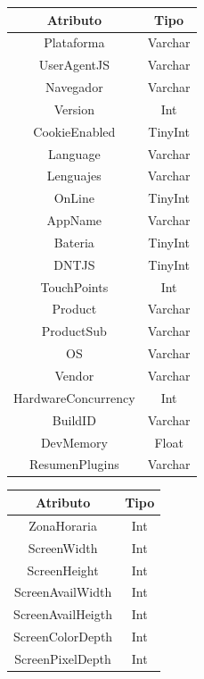 \begin{itemize}
\begin{table}[tbp]
\begin{minipage}[c]{85mm}
            \begin{tabular}{c|c}
                \textbf{Atributo} & \textbf{Tipo} \\ \hline
                Plataforma & Varchar\\
                UserAgentJS & Varchar\\
                Navegador & Varchar\\
                Version & Int\\
                CookieEnabled & TinyInt\\
                Language & Varchar\\
                Lenguajes & Varchar\\
                OnLine & TinyInt\\
                AppName & Varchar\\
                Bateria & TinyInt\\
                DNTJS & TinyInt\\
                TouchPoints & Int\\
                Product & Varchar\\
                ProductSub & Varchar\\
                OS & Varchar\\
                Vendor & Varchar\\
                HardwareConcurrency & Int\\
                BuildID & Varchar\\
                DevMemory & Float\\
                ResumenPlugins & Varchar\\
            \end{tabular}
        \end{minipage}
        \begin{minipage}[c]{45mm}
        \centering
            \begin{tabular}{c|c}
                \textbf{Atributo} & \textbf{Tipo} \\ \hline
                ZonaHoraria & Int\\
                ScreenWidth & Int\\
                ScreenHeight & Int\\
                ScreenAvailWidth & Int\\
                ScreenAvailHeigth & Int\\
                ScreenColorDepth & Int\\
                ScreenPixelDepth & Int\\

\end{tabular}
\end{minipage}
\end{table}
\end{itemize}
